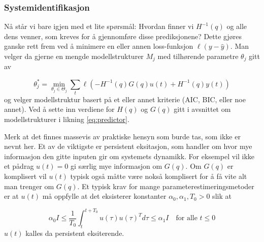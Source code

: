 \subsubsection{Systemidentifikasjon}
Nå står vi bare igjen med et lite spørsmål: Hvordan finner vi $H^{-1}(q)$ og alle dens venner, som kreves for å gjennomføre disse prediksjonene? Dette gjøres ganske rett frem ved å minimere en eller annen loss-funksjon $\ell ( y - \hat{y} )$. Man velger da gjerne en mengde modellstrukturer $M_j$ med tilhørende parametre $\theta_j$ gitt av

\begin{equation}
	\theta_{j}^{*}=\underset{\theta_{j} \in \Theta_{j}}{\min } \sum_{t} \ell\left(-H^{-1}(q) G(q) u(t)+H^{-1}(q) y(t)\right)
\end{equation}
og velger modellstruktur basert på et eller annet kriterie (AIC, BIC, eller noe annet). Ved å sette inn verdiene for $H(q)$ og $G(q)$ gitt i avsnittet om modellstrukturer i likning \ref{eq:predictor}.

Merk at det finnes massevis av praktiske hensyn som burde tas, som ikke er nevnt her. Et av de viktigste er persistent eksitasjon, som handler om hvor mye informasjon den gitte inputen gir om systemets dynamikk. For eksempel vil ikke et pådrag $u(t) = 0$ gi særlig mye informasjon om $G(q)$. Om $G(q)$ er komplisert vil $u(t)$ typisk også måtte være nokså komplisert for å få vite alt man trenger om $G(q)$. Et typisk krav for mange parameterestimeringsmetoder er at $u(t)$ må oppfylle at det eksisterer konstanter $\alpha_0, \alpha_1, T_0 > 0$ slik at 

\begin{equation}
	\alpha_0 I \leq \frac{1}{T_0} \int_t^{t + T_0} u(\tau) u(\tau)^T d\tau \leq \alpha_1 I \quad \textrm{for alle } t \leq 0
\end{equation}
$u(t)$ kalles da persistent eksiterende.

